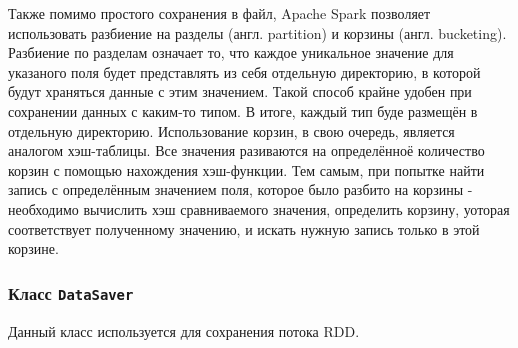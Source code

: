 Также помимо простого сохранения в файл, Apache Spark позволяет использовать разбиение на разделы (англ. partition) и корзины (англ. bucketing).
Разбиение по разделам означает то, что каждое уникальное значение для указаного поля будет представлять из себя отдельную директорию, в которой будут храняться данные с этим значением.
Такой способ крайне удобен при сохранении данных с каким-то типом.
В итоге, каждый тип буде размещён в отдельную директорию.
Использование корзин, в свою очередь, является аналогом хэш-таблицы.
Все значения разиваются на определённоё количество корзин с помощью нахождения хэш-функции.
Тем самым, при попытке найти запись с определённым значением поля, которое было разбито на корзины - необходимо вычислить хэш сравниваемого значения, определить корзину, уоторая соответствует полученному значению, и искать нужную запись только в этой корзине.

\subsubsection{Класс \texttt{DataSaver}}
Данный класс используется для сохранения потока RDD.
